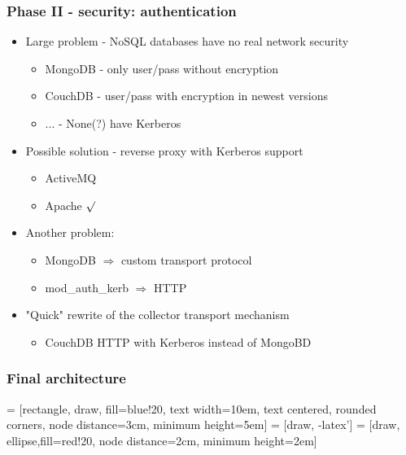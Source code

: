 \documentclass{beamer}
\begin{document}
\begin{frame}[t, fragile]
\frametitle{Phase II - security: authentication}
\begin{itemize}
\item Large problem - NoSQL databases have no real network security
\begin{itemize}
	\item MongoDB - only user/pass without encryption
	\item CouchDB - user/pass with encryption in newest versions
	\item ... - None(?) have Kerberos
\end{itemize}
 \item Possible solution - reverse proxy with Kerberos support
\begin{itemize}
	\item ActiveMQ
	\item Apache $\surd$
\end{itemize}
 \item Another problem:
\begin{itemize}
	\item MongoDB $\Longrightarrow$ custom transport protocol
	\item mod\_auth\_kerb $\Longrightarrow$ HTTP
\end{itemize} 
\item "Quick" rewrite of the collector transport mechanism
\begin{itemize}
	\item CouchDB HTTP with Kerberos instead of MongoBD
\end{itemize}
\end{itemize}
\end{frame}

\begin{frame}[c, fragile]
\frametitle{Final architecture}
{ \tiny
{} = [rectangle, draw, fill=blue!20, 
    text width=10em, text centered, rounded corners, node distance=3cm,
    minimum height=5em]
 = [draw, -latex']
 = [draw, ellipse,fill=red!20, node distance=2cm,
    minimum height=2em]
}
\end{frame}
\end{document}
